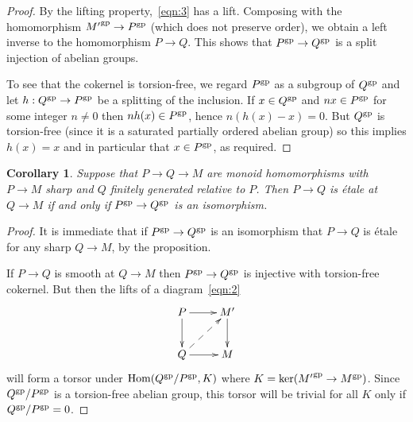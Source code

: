 \documentclass[12pt]{amsart}
\newtheorem{corollary}[theorem]{Corollary}
\theoremstyle{definition}
\theoremstyle{remark}
\def\Hom{\operatorname{Hom}}
\begin{document}
\begin{proof}
By the lifting property,~\eqref{eqn:3} has a lift.  Composing with the homomorphism ${M'}^{\rm gp} \to P^{\rm gp}$ (which does not preserve order), we obtain a left inverse to the homomorphism $P \to Q$.  This shows that $P^{\rm gp} \to Q^{\rm gp}$ is a split injection of abelian groups.  

To see that the cokernel is torsion-free, we regard $P^{\rm gp}$ as a subgroup of $Q^{\rm gp}$ and let $h : Q^{\rm gp} \to P^{\rm gp}$ be a splitting of the inclusion.  If $x \in Q^{\rm gp}$ and $nx \in P^{\rm gp}$ for some integer $n \neq 0$ then $n h(x) \in P^{\rm gp}$, hence $n (h(x) - x) = 0$.  But $Q^{\rm gp}$ is torsion-free (since it is a saturated partially ordered abelian group) so this implies $h(x) = x$ and in particular that $x \in P^{\rm gp}$, as required.
\end{proof}

\begin{corollary}
Suppose that $P \to Q \to M$ are monoid homomorphisms with $P \to M$ sharp and $Q$ finitely generated relative to $P$.  Then $P \to Q$ is \'etale at $Q \to M$ if and only if $P^{\rm gp} \to Q^{\rm gp}$ is an isomorphism.
\end{corollary}
\begin{proof}
It is immediate that if $P^{\rm gp} \to Q^{\rm gp}$ is an isomorphism that $P \to Q$ is \'etale for any sharp $Q \to M$, by the proposition.

If $P \to Q$ is smooth at $Q \to M$ then $P^{\rm gp} \to Q^{\rm gp}$ is injective with torsion-free cokernel.  But then the lifts of a diagram~\eqref{eqn:2} 
\begin{equation} \label{eqn:2} \vcenter{ \xymatrix{
P \ar[r] \ar[d] & M' \ar[d] \\
Q \ar[r] \ar@{-->}[ur] & M
} } \end{equation}
will form a torsor under $\Hom(Q^{\rm gp} / P^{\rm gp}, K)$ where $K = \ker({M'}^{\rm gp} \to M^{\rm gp})$.  Since $Q^{\rm gp} / P^{\rm gp}$ is a torsion-free abelian group, this torsor will be trivial for all $K$ only if $Q^{\rm gp} / P^{\rm gp} = 0$.
\end{proof}
\end{document}
